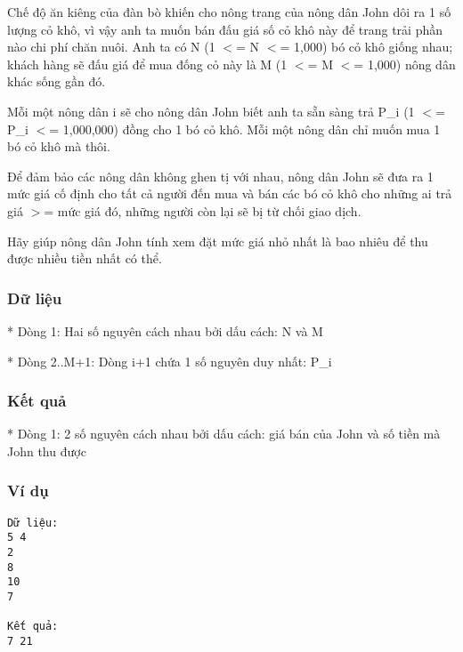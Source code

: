 



   Chế độ ăn kiêng của đàn bò khiến cho nông trang của nông dân John dôi ra 1 số lượng cỏ khô, vì vậy anh ta muốn bán đấu giá số cỏ khô này để trang trải phần nào chi phí chăn nuôi. Anh ta có N (1 $<$= N $<$= 1,000) bó cỏ khô giống nhau; khách hàng sẽ đấu giá để mua đống cỏ này là M (1 $<$= M $<$= 1,000) nông dân khác sống gần đó.  

   Mỗi một nông dân i sẽ cho nông dân John biết anh ta sẵn sàng trả P\_i (1 $<$= P\_i $<$= 1,000,000) đồng cho 1 bó cỏ khô. Mỗi một nông dân chỉ muốn mua 1 bó cỏ khô mà thôi.  

   Để đảm bảo các nông dân không ghen tị với nhau, nông dân John sẽ đưa ra 1 mức giá cố định cho tất cả người đến mua và bán các bó cỏ khô cho những ai trả giá $>$= mức giá đó, những người còn lại sẽ bị từ chối giao dịch.  

   Hãy giúp nông dân John tính xem đặt mức giá nhỏ nhất là bao nhiêu để thu được nhiều tiền nhất có thể.  

\subsubsection{   Dữ liệu  }

   * Dòng 1: Hai số nguyên cách nhau bởi dấu cách: N và M  

   * Dòng 2..M+1: Dòng i+1 chứa 1 số nguyên duy nhất: P\_i  

\subsubsection{   Kết quả  }

   * Dòng 1: 2 số nguyên cách nhau bởi dấu cách: giá bán của John và số tiền mà John thu được  

\subsubsection{   Ví dụ  }
\begin{verbatim}
Dữ liệu:
5 4
2
8
10
7

Kết quả:
7 21

\end{verbatim}